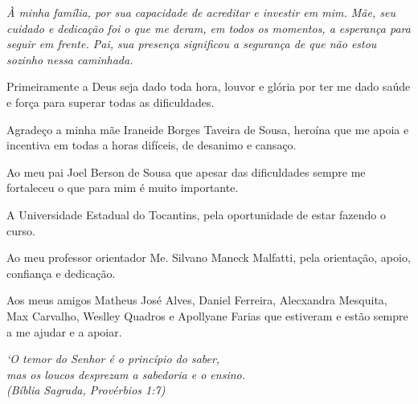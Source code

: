 \begin{folhadeaprovacao}
   \begin{center}
    \vspace*{0.4cm}
    {\large\imprimirlocal}
    \par
    {\large\imprimirdata}
    \vspace*{0.7cm}
  \end{center}
  
\end{folhadeaprovacao}

\begin{dedicatoria}
   \vspace*{\fill}
   \centering
   \noindent
   \textit{À minha família, por sua capacidade de acreditar e investir em mim. Mãe, seu cuidado e dedicação foi o que me deram, em todos os momentos, a esperança para seguir em frente. Pai, sua presença significou a segurança de que não estou sozinho nessa caminhada. } \vspace*{\fill}
\end{dedicatoria}

\begin{agradecimentos}
Primeiramente a Deus seja dado toda hora, louvor e glória por ter me dado saúde e força para superar todas as dificuldades.

Agradeço a minha mãe Iraneide Borges Taveira de Sousa, heroína que me apoia e incentiva em todas a horas difíceis, de desanimo e cansaço.

Ao meu pai Joel Berson de Sousa que apesar das dificuldades sempre me fortaleceu o que para mim é muito importante.

A Universidade Estadual do Tocantins, pela oportunidade de estar fazendo o curso.

Ao meu professor orientador Me. Silvano Maneck Malfatti, pela orientação, apoio, confiança e dedicação.

Aos meus amigos Matheus José Alves, Daniel Ferreira, Alecxandra Mesquita, Max Carvalho, Weslley Quadros e Apollyane Farias que estiveram e estão sempre a me ajudar e a apoiar.


\end{agradecimentos}

\begin{epigrafe}
    \vspace*{\fill}
	\begin{flushright}
		\textit{`O temor do Senhor é o princípio do saber,\\
			mas os loucos desprezam a sabedoria e o ensino.\\
		(Bíblia Sagrada, Provérbios 1:7)}
	\end{flushright}
\end{epigrafe}


